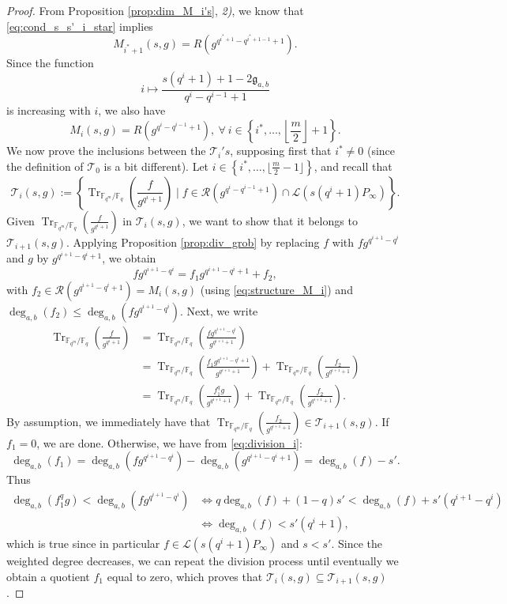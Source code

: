 \documentclass[a4paper]{article}
\theoremstyle{definition}
\theoremstyle{remark}
\newcommand{\calL}{\mathcal{L}}
\newcommand{\calR}{\mathcal{R}}
\newcommand{\calT}{\mathcal{T}}
\newcommand{\fq}{\mathbb{F}_{q}}
\newcommand{\Tr}[1]{\operatorname{Tr}_{\mathbb{F}_{q^m}/\fq}\left(#1\right)}
\newcommand{\set}[1]{\left\{#1\right\}}
\newcommand{\degab}[1]{\deg_{a,b}\left(#1\right)}
\begin{document}
\begin{proof}
From Proposition \ref{prop:dim_M_i's}, \textit{2)}, we know that \eqref{eq:cond_s_s'_i_star} implies $$M_{i^*+1}(s,g) = R(g^{q^{i^*+1}-q^{i^*+1-1}+1}).$$ 
Since the function $$i \mapsto \dfrac{s(q^i+1)+1-2\mathfrak{g}_{a,b}}{q^i-q^{i-1}+1}$$ 
is increasing with $i$, we also have
\begin{equation} \label{eq:structure_M_i}
M_{i}(s,g) = R(g^{q^{i}-q^{i-1}+1}), \ \forall \ i \in \set{i^*,\dots,\left\lfloor \frac{m}{2}\right\rfloor+1}.
\end{equation} 
We now prove the inclusions between the $\calT_i's$, supposing first that $i^* \neq 0$ (since the definition of $\calT_0$ is a bit different). Let $i \in \set{i^*,\dots,\lfloor \frac{m}{2}-1 \rfloor}$, and recall that 
$$\calT_i(s,g) := \set{\Tr{\frac{f}{g^{q^i+1}}} \mid f \in \calR(g^{q^i-q^{i-1}+1})\cap \calL(s(q^i+1)P_\infty)}.$$
Given $\Tr{\frac{f}{g^{q^i+1}}}$ in $\calT_i(s,g)$, we want to show that it belongs to $\calT_{i+1}(s,g)$. Applying Proposition \ref{prop:div_grob} by replacing $f$ with $fg^{q^{i+1}-q^i}$ and $g$ by $g^{q^{i+1}-q^i+1}$, we obtain
\begin{equation} \label{eq:division_i}
fg^{q^{i+1}-q^i} = f_1g^{q^{i+1}-q^i+1} + f_2,
\end{equation}
with $f_2 \in \calR(g^{q^{i+1}-q^i+1}) = M_i(s,g)$ (using \eqref{eq:structure_M_i}) and $\degab{f_2} \leq \degab{fg^{q^{i+1}-q^i}}$. Next, we write
\begin{align*}
    \Tr{\frac{f}{g^{q^i+1}}} &= \Tr{\frac{fg^{q^{i+1}-q^i}}{g^{q^{i+1}+1}}} \\
                             &= \Tr{\frac{f_1g^{q^{i+1}-q^i+1}}{g^{q^{i+1}+1}}} + \Tr{\frac{f_2}{g^{q^{i+1}+1}}} \\
                             &= \Tr{\frac{f_1^qg}{g^{q^{i+1}+1}}} + \Tr{\frac{f_2}{g^{q^{i+1}+1}}}.
\end{align*}
By assumption, we immediately have that $\Tr{\frac{f_2}{g^{q^{i+1}+1}}} \in \calT_{i+1}(s,g).$
If $f_1=0$, we are done. Otherwise, we have from \eqref{eq:division_i}:
$$\degab{f_1} = \degab{fg^{q^{i+1}-q^i}} - \degab{g^{q^{i+1}-q^i+1}} = \degab{f}-s'.$$
Thus
\begin{align*}
     \degab{f_1^qg} < \degab{fg^{q^{i+1}-q^i}} & \iff q\degab{f} +(1-q)s' < \degab{f} +s'(q^{i+1}-q^i) \\
                                               & \iff \degab{f} < s'(q^{i}+1),
\end{align*}
which is true since in particular $f \in \calL(s(q^i+1)P_\infty)$ and $s<s'$. Since the weighted degree decreases, we can repeat the division process until eventually we obtain a quotient $f_1$ equal to zero, which proves that $\calT_i(s,g) \subseteq \calT_{i+1}(s,g)$.


\end{proof}
\end{document}
